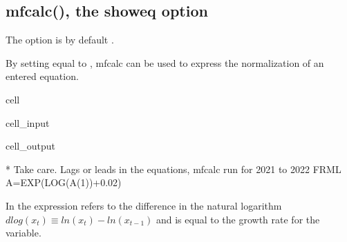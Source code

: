 \documentclass[letterpaper,10pt,english]{jupyterBook}
\begin{document}
\subsection{mfcalc(), the showeq option}
\label{\detokenize{content/04_PythonEssentials/ExtendingDataFrames:mfcalc-the-showeq-option}}
\sphinxAtStartPar
The  option is by default .

\sphinxAtStartPar
By setting equal to , mfcalc can be used to express the normalization of an entered equation.

\begin{sphinxuseclass}{cell}\begin{sphinxVerbatimInput}

\begin{sphinxuseclass}{cell_input}
\begin{sphinxVerbatim}[commandchars=\\\{\}]
\end{sphinxVerbatim}

\end{sphinxuseclass}\end{sphinxVerbatimInput}
\begin{sphinxVerbatimOutput}

\begin{sphinxuseclass}{cell_output}
\begin{sphinxVerbatim}[commandchars=\\\{\}]
* Take care. Lags or leads in the equations, mfcalc run for 2021 to 2022
FRML \PYGZlt{}\PYGZgt{} A=EXP(LOG(A(\PYGZhy{}1))+0.02)\PYGZdl{}
\end{sphinxVerbatim}

\end{sphinxuseclass}\end{sphinxVerbatimOutput}

\end{sphinxuseclass}
\sphinxAtStartPar
In  the expression  refers to the difference in the natural logarithm \(dlog(x_t) \equiv ln(x_t)-ln(x_{t-1})\) and is equal to the growth rate for the variable.
\end{document}
